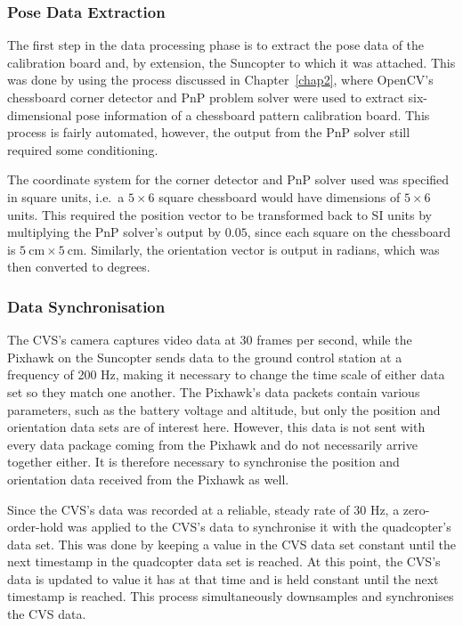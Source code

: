 \subsubsection{Pose Data Extraction}

The first step in the data processing phase is to extract the pose data of the calibration board and, by extension, the Suncopter to which it was attached. This was done by using the process discussed in Chapter~\ref{chap2}, where OpenCV's chessboard corner detector and PnP problem solver were used to extract six-dimensional pose information of a chessboard pattern calibration board. This process is fairly automated, however, the output from the PnP solver still required some conditioning.

The coordinate system for the corner detector and PnP solver used was specified in square units, i.e.\ a $5\times6$ square chessboard would have dimensions of $5\times6$ units. This required the position vector to be transformed back to SI units by multiplying the PnP solver's output by $0.05$, since each square on the chessboard is $\SI{5}{\cm}\times\SI{5}{\cm}$. Similarly, the orientation vector is output in radians, which was then converted to degrees. 

\subsubsection{Data Synchronisation}

The CVS's camera captures video data at 30 frames per second, while the Pixhawk on the Suncopter sends data to the ground control station at a frequency of 200 Hz, making it necessary to change the time scale of either data set so they match one another. The Pixhawk's data packets contain various parameters, such as the battery voltage and altitude, but only the position and orientation data sets are of interest here. However, this data is not sent with every data package coming from the Pixhawk and do not necessarily arrive together either. It is therefore necessary to synchronise the position and orientation data received from the Pixhawk as well.

Since the CVS's data was recorded at a reliable, steady rate of 30 Hz, a zero-order-hold was applied to the CVS's data to synchronise it with the quadcopter's data set. This was done by keeping a value in the CVS data set constant until the next timestamp in the quadcopter data set is reached. At this point, the CVS's data is updated to value it has at that time and is held constant until the next timestamp is reached. This process simultaneously downsamples and synchronises the CVS data.  

